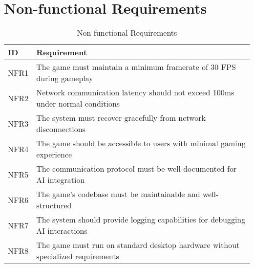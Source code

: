 \section{Non-functional Requirements}
\begin{table}[H]
    \centering
    \begin{tabular}{|p{}|p{}|}
        \hline
        \textbf{ID} & \textbf{Requirement} \\
        \hline
        NFR1 & The game must maintain a minimum framerate of 30 FPS during gameplay \\
        \hline
        NFR2 & Network communication latency should not exceed 100ms under normal conditions \\
        \hline
        NFR3 & The system must recover gracefully from network disconnections \\
        \hline
        NFR4 & The game should be accessible to users with minimal gaming experience \\
        \hline
        NFR5 & The communication protocol must be well-documented for AI integration \\
        \hline
        NFR6 & The game's codebase must be maintainable and well-structured \\
        \hline
        NFR7 & The system should provide logging capabilities for debugging AI interactions \\
        \hline
        NFR8 & The game must run on standard desktop hardware without specialized requirements \\
        \hline
    \end{tabular}
    \caption{Non-functional Requirements}
\end{table}